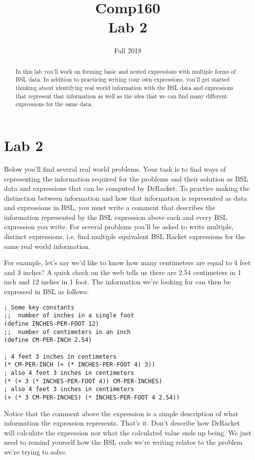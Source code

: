 \documentclass[nobib]{tufte-handout}
\title{Comp160 \\ Lab 2 }
\author{}
\date{ Fall 2018 }
\begin{document}
\maketitle

\begin{abstract}
In this lab you'll work on forming basic and nested expressions with multiple forms of BSL data. In addition to practicing writing your own expressions, you'll get started thinking about identifying real world information with the BSL data and expressions that represent that information as well as the idea that we can find many different expressions for the same data.
\end{abstract}

\section{Lab 2}

Below you'll find several real world problems. Your task is to find ways of representing the information required for the problems and their solution as BSL data and expressions that can be computed by DrRacket. To practice making the distinction between information and how that information is represented as data and expressions in BSL, you must write a comment that describes the information represented by the BSL expression above each and every BSL expression you write.  For several problems you'll be asked to write multiple, distinct expressions, i.e. find multiple equivalent BSL Racket expressions for the same real world information.

For example, let's say we'd like to know how many centimeters are equal to 4 feet and 3 inches?  A quick check on the web tells us there are 2.54 centimeters in 1 inch and 12 inches in 1 foot.  The information we're looking for can then be expressed in BSL as follows:

\begin{lstlisting}
; Some key constants
;;  number of inches in a single foot
(define INCHES-PER-FOOT 12)
;;  number of centimeters in an inch
(define CM-PER-INCH 2.54)

; 4 feet 3 inches in centimeters
(* CM-PER-INCH (+ (* INCHES-PER-FOOT 4) 3))
; also 4 feet 3 inches in centimeters
(* (+ 3 (* INCHES-PER-FOOT 4)) CM-PER-INCHES)
; also 4 feet 3 inches in centimeters
(+ (* 3 CM-PER-INCHES) (* INCHES-PER-FOOT 4 2.54))
\end{lstlisting}

Notice that the comment above the expression is a simple description of what information the expression represents.  That's it. Don't describe how DrRacket will calculate the expression nor what the calculated value ends up being. We just need to remind yourself how the BSL code we're writing relates to the problem we're trying to solve.
\end{document}
